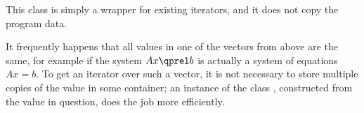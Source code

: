 This class is simply a wrapper for existing iterators, and it does not
copy the program data.

It frequently happens that all values in one of the vectors from
above are the same, for example if the system $Ax\qprel b$ is 
actually a system of equations $Ax=b$. To get an iterator over such a 
vector, it is not necessary to store multiple copies of the value in
some container; an instance of the class ,
constructed from the value in question, does the job more efficiently.
